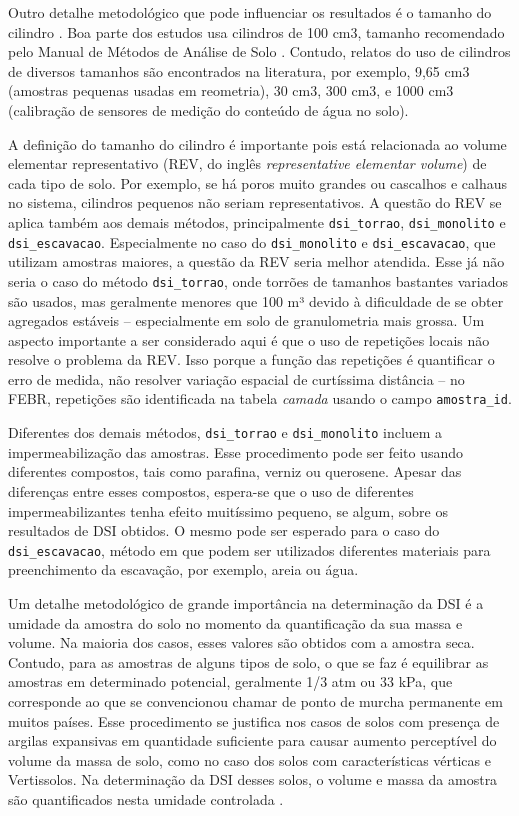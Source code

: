 \documentclass[
]{book}
\begin{document}
Outro detalhe metodológico que pode influenciar os resultados é o tamanho do cilindro \citep{Al-ShammaryEtAl2018, CasanovaEtAl2016}. Boa parte dos estudos usa cilindros de 100 cm3, tamanho recomendado pelo Manual de Métodos de Análise de Solo \citep{AlmeidaEtAl2017}. Contudo, relatos do uso de cilindros de diversos tamanhos são encontrados na literatura, por exemplo, 9,65 cm3 (amostras pequenas usadas em reometria), 30 cm3, 300 cm3, e 1000 cm3 (calibração de sensores de medição do conteúdo de água no solo).

A definição do tamanho do cilindro é importante pois está relacionada ao volume elementar representativo (REV, do inglês \emph{representative elementar volume}) de cada tipo de solo. Por exemplo, se há poros muito grandes ou cascalhos e calhaus no sistema, cilindros pequenos não seriam representativos. A questão do REV se aplica também aos demais métodos, principalmente \texttt{dsi\_torrao}, \texttt{dsi\_monolito} e \texttt{dsi\_escavacao}. Especialmente no caso do \texttt{dsi\_monolito} e \texttt{dsi\_escavacao}, que utilizam amostras maiores, a questão da REV seria melhor atendida. Esse já não seria o caso do método \texttt{dsi\_torrao}, onde torrões de tamanhos bastantes variados são usados, mas geralmente menores que 100 m³ devido à dificuldade de se obter agregados estáveis -- especialmente em solo de granulometria mais grossa. Um aspecto importante a ser considerado aqui é que o uso de repetições locais não resolve o problema da REV. Isso porque a função das repetições é quantificar o erro de medida, não resolver variação espacial de curtíssima distância -- no FEBR, repetições são identificada na tabela \emph{camada} usando o campo \texttt{amostra\_id}.

Diferentes dos demais métodos, \texttt{dsi\_torrao} e \texttt{dsi\_monolito} incluem a impermeabilização das amostras. Esse procedimento pode ser feito usando diferentes compostos, tais como parafina, verniz ou querosene. Apesar das diferenças entre esses compostos, espera-se que o uso de diferentes impermeabilizantes tenha efeito muitíssimo pequeno, se algum, sobre os resultados de DSI obtidos. O mesmo pode ser esperado para o caso do \texttt{dsi\_escavacao}, método em que podem ser utilizados diferentes materiais para preenchimento da escavação, por exemplo, areia ou água.

Um detalhe metodológico de grande importância na determinação da DSI é a umidade da amostra do solo no momento da quantificação da sua massa e volume. Na maioria dos casos, esses valores são obtidos com a amostra seca. Contudo, para as amostras de alguns tipos de solo, o que se faz é equilibrar as amostras em determinado potencial, geralmente 1/3 atm ou 33 kPa, que corresponde ao que se convencionou chamar de ponto de murcha permanente em muitos países. Esse procedimento se justifica nos casos de solos com presença de argilas expansivas em quantidade suficiente para causar aumento perceptível do volume da massa de solo, como no caso dos solos com características vérticas e Vertissolos. Na determinação da DSI desses solos, o volume e massa da amostra são quantificados nesta umidade controlada \citep{MathieuEtAl1998}.
\end{document}
